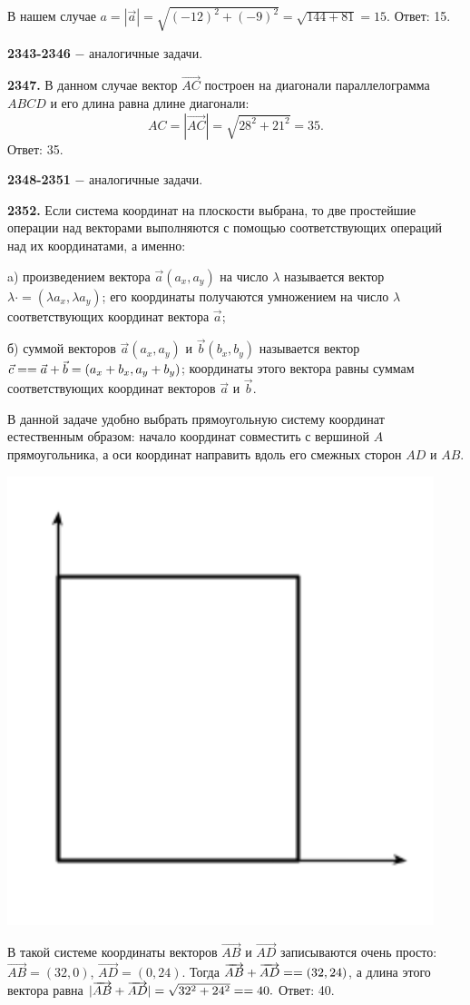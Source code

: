 В нашем случае $a = |\vec{a}|=\sqrt{(-12)^2+(-9)^2}=\sqrt{144+81}=15.$ \newline \null \hspace*{\fill} Ответ: 15.

\textbf{2343-2346} $-$ аналогичные задачи.

\textbf{2347.} В данном случае вектор $\overrightarrow{AC}$ построен на диагонали параллелограмма $ABCD$ и его длина равна длине диагонали:
\[
AC=|\overrightarrow{AC}|=\sqrt{28^2+21^2}=35.
\]\null \hspace*{\fill} Ответ: 35.

\textbf{2348-2351} $-$ аналогичные задачи.

\textbf{2352.} Если система координат на плоскости выбрана, то две простейшие операции над векторами выполняются с помощью соответствующих операций над их координатами, а именно:

a) произведением вектора $\vec{a}(a_x, a_y)$ на число $\lambda$ называется вектор $\lambda \cdot = (\lambda a_x, \lambda a_y)$; его координаты получаются умножением на число $\lambda$ соответствующих координат вектора $\vec{a}$;

б) суммой векторов $\vec{a}(a_x, a_y)$ и $\vec{b}(b_x, b_y)$ называется вектор $\vec{c}=\linebreak=\vec{a}+\vec{b}=(a_x+b_x, a_y+b_y)$; координаты этого вектора равны суммам соответствующих координат векторов $\vec{a}$ и $\vec{b}$. 

В данной задаче удобно выбрать прямоугольную систему координат естественным образом: начало координат совместить с вершиной $A$ прямоугольника, а оси координат направить вдоль его смежных сторон $AD$ и $AB$.

{\centering \includegraphics[width=0.4\linewidth]{Geometry/Content/55.png}
	
}

В такой системе  координаты векторов $\overrightarrow{AB}$ и $\overrightarrow{AD}$ записываются очень просто: $\overrightarrow{AB} = (32, 0)$, $\overrightarrow{AD} = (0, 24)$. Тогда $\overrightarrow{AB} + \overrightarrow{AD} = \linebreak =(32, 24)$, а длина этого вектора равна $|\overrightarrow{AB} + \overrightarrow{AD}| = \sqrt{32^2+24^2}=\linebreak=40.$ \newline \null \hspace*{\fill} Ответ: 40.

